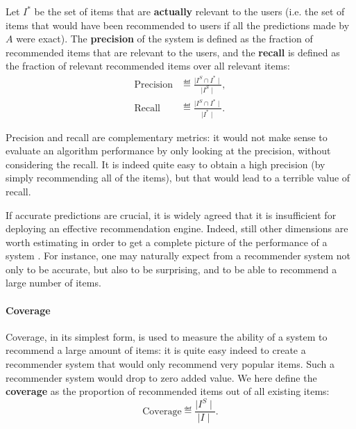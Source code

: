 Let $I^*$ be the set of items that are \textbf{actually} relevant to the users
(i.e.  the set of items that would have been recommended to users if all the
predictions made by $A$ were exact).  The \textbf{precision} of the system is
defined as the fraction of recommended items that are relevant to the users,
and the \textbf{recall} is defined as the fraction of relevant recommended
items over all relevant items:
\begin{align*}
  \text{Precision} &\eqdef \frac{\mid I^S \cap I^*\mid}{\mid I^S \mid},\\
  \text{Recall} &\eqdef \frac{\mid I^S \cap I^*\mid}{\mid I^* \mid}.
\end{align*}

Precision and recall are complementary metrics: it would not make sense to
evaluate an algorithm performance by only looking at the precision, without
considering the recall. It is indeed quite easy to obtain a high precision (by
simply recommending all of the items), but that would lead to a terrible
value of recall.

If accurate predictions are crucial, it is widely agreed that it is
insufficient for deploying an effective recommendation engine. Indeed, still
other dimensions are worth estimating in order to get a complete picture of the
performance of a system
\cite{NeeRieKonACM2006,HerKonJohTerRieACM2004,KamBriRecSys2014}.  For instance,
one may naturally expect from a recommender system not only to be accurate, but
also to be surprising, and to be able to recommend a large number of items.

\paragraph{Coverage\\}
Coverage, in its simplest form, is used to measure the ability of a system to
recommend a large amount of items: it is quite easy indeed to create a
recommender system that would only recommend very popular items. Such a
recommender system would drop to zero added value. We here define the
\textbf{coverage} as the proportion of recommended items out of all existing
items:
$$\text{Coverage} \eqdef \frac{\mid I^S\mid}{\mid I\mid}.$$

